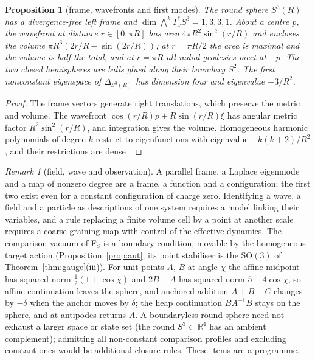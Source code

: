 \documentclass[aps,pra,onecolumn,superscriptaddress,nofootinbib,10pt]{revtex4-2}
\newtheorem{proposition}[theorem]{Proposition}
\theoremstyle{definition}
\theoremstyle{remark}
\newtheorem{remark}[theorem]{Remark}
\newcommand{\R}{\mathbb{R}}
\newcommand{\SO}{\mathrm{SO}}
\begin{document}
\begin{proposition}[frame, wavefronts and first modes]\label{prop:sksphere}
The round sphere $S^3(R)$ has a divergence-free left frame and $\dim\bigwedge^kT^*_xS^3=1,3,3,1$.  About a centre $p$, the
wavefront at distance $r\in[0,\pi R]$ has area $4\pi R^2\sin^2(r/R)$ and encloses the volume $\pi R^3(2r/R-\sin(2r/R))$; at
$r=\pi R/2$ the area is maximal and the volume is half the total, and at $r=\pi R$ all radial geodesics meet at $-p$.
The two closed hemispheres are balls glued along their boundary $S^2$.  The first nonconstant eigenspace of
$\Delta_{S^3(R)}$ has dimension four and eigenvalue $-3/R^2$.
\end{proposition}
\begin{proof}
The frame vectors generate right translations, which preserve the metric and volume.  The wavefront
$\cos(r/R)p+R\sin(r/R)\xi$ has angular metric factor $R^2\sin^2(r/R)$, and integration gives the volume.  Homogeneous
harmonic polynomials of degree $k$ restrict to eigenfunctions with eigenvalue $-k(k+2)/R^2$, and their
restrictions are dense \cite[Ch.~2]{n6:axler}.
\end{proof}
\begin{remark}[field, wave and observation]\label{rem:skintrinsic}
A parallel frame, a Laplace eigenmode and a map of nonzero degree are a frame, a function and a
configuration; the first two exist even for a constant configuration of charge zero.  Identifying a wave, a
field and a particle as descriptions of one system requires a model linking their variables, and a rule
replacing a finite volume cell by a point at another scale requires a coarse-graining map with control of
the effective dynamics.  The comparison vacuum of F$_{\mathrm S}$ is a boundary condition, movable by the homogeneous
target action (Proposition~\ref{prop:aut}; its point stabiliser is the $\SO(3)$ of Theorem~\ref{thm:gauge}(iii)).  For unit
points $A$, $B$ at angle $\chi$ the affine midpoint has squared norm $\tfrac12(1+\cos\chi)$ and $2B-A$ has squared norm
$5-4\cos\chi$, so affine continuation leaves the sphere, and anchored addition $A+B-C$ changes by $-\delta$ when the
anchor moves by $\delta$; the heap continuation $BA^{-1}B$ stays on the sphere, and at antipodes returns $A$.  A boundaryless round sphere need not exhaust a larger space or state set (the round
$S^3\subset\R^4$ has an ambient complement); admitting all non-constant comparison profiles and excluding constant
ones would be additional closure rules.  These items are a programme.
\end{remark}
\end{document}
